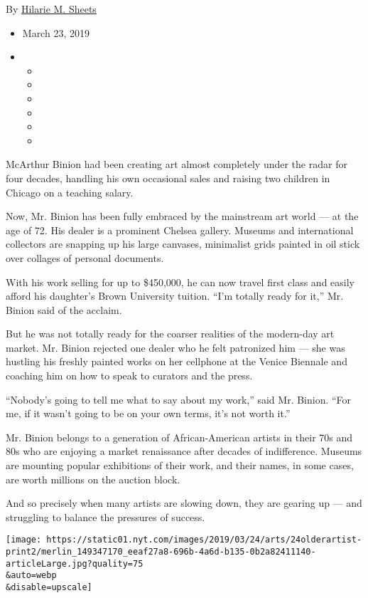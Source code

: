 By \href{https://www.nytimes.com/by/hilarie-m-sheets}{Hilarie M. Sheets}

\begin{itemize}
\item
  March 23, 2019
\item
  \begin{itemize}
  \item
  \item
  \item
  \item
  \item
  \item
  \end{itemize}
\end{itemize}

McArthur Binion had been creating art almost completely under the radar
for four decades, handling his own occasional sales and raising two
children in Chicago on a teaching salary.

Now, Mr. Binion has been fully embraced by the mainstream art world ---
at the age of 72. His dealer is a prominent Chelsea gallery. Museums and
international collectors are snapping up his large canvases, minimalist
grids painted in oil stick over collages of personal documents.

With his work selling for up to \$450,000, he can now travel first class
and easily afford his daughter's Brown University tuition. ``I'm totally
ready for it,'' Mr. Binion said of the acclaim.

But he was not totally ready for the coarser realities of the modern-day
art market. Mr. Binion rejected one dealer who he felt patronized him
--- she was hustling his freshly painted works on her cellphone at the
Venice Biennale and coaching him on how to speak to curators and the
press.

``Nobody's going to tell me what to say about my work,'' said Mr.
Binion. ``For me, if it wasn't going to be on your own terms, it's not
worth it.''

Mr. Binion belongs to a generation of African-American artists in their
70s and 80s who are enjoying a market renaissance after decades of
indifference. Museums are mounting popular exhibitions of their work,
and their names, in some cases, are worth millions on the auction block.

And so precisely when many artists are slowing down, they are gearing up
--- and struggling to balance the pressures of success.

\texttt{[image: https://static01.nyt.com/images/2019/03/24/arts/24olderartist-print2/merlin\_149347170\_eeaf27a8-696b-4a6d-b135-0b2a82411140-articleLarge.jpg?quality=75\\\&auto=webp\\\&disable=upscale]}

